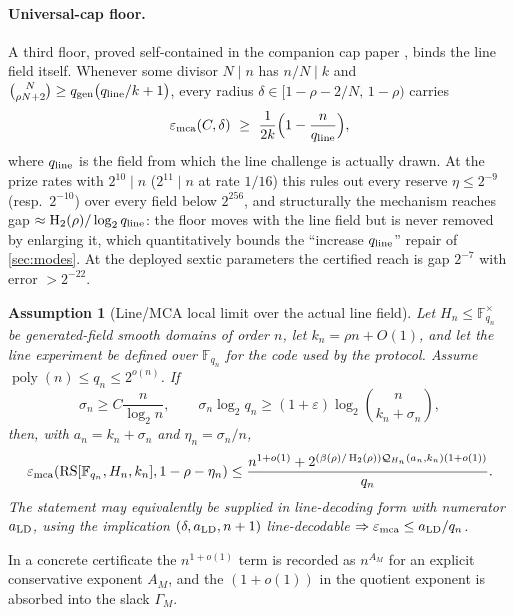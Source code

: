 \documentclass[11pt]{article}
\newtheorem{assumption}[theorem]{Assumption}
\theoremstyle{definition}
\newcommand{\F}{\mathbb F}
\newcommand{\RS}{\operatorname{RS}}
\newcommand{\poly}{\operatorname{poly}}
\newcommand{\eps}{\varepsilon}
\newcommand{\Hbin}{\operatorname{H}_2}
\newcommand{\mca}{\varepsilon_{\rm mca}}
\newcommand{\Qprof}{\mathcal Q}
\newcommand{\qgen}{q_{\rm gen}}
\newcommand{\qline}{q_{\rm line}}
\begin{document}
\paragraph{Universal-cap floor.}
A third floor, proved self-contained in the companion cap paper \cite{UniversalCap}, binds the line field itself.  Whenever some divisor $N\mid n$ has $n/N\mid k$ and $\binom{N}{\rho N+2}\ge\qgen\bigl(\qline/k+1\bigr)$, every radius $\delta\in[1-\rho-2/N,\,1-\rho)$ carries
\begin{equation}
\label{eq:cap-floor}
        \mca(C,\delta)\ \ge\ \frac1{2k}\Bigl(1-\frac n{\qline}\Bigr),
\end{equation}
where $\qline$ is the field from which the line challenge is actually drawn.  At the prize rates with $2^{10}\mid n$ ($2^{11}\mid n$ at rate $1/16$) this rules out every reserve $\eta\le2^{-9}$ (resp.\ $2^{-10}$) over every field below $2^{256}$, and structurally the mechanism reaches gap $\approx\Hbin(\rho)/\log_2\qline$: the floor moves with the line field but is never removed by enlarging it, which quantitatively bounds the ``increase $\qline$'' repair of \cref{sec:modes}.  At the deployed sextic parameters the certified reach is gap $2^{-7}$ with error $>2^{-22}$.

\begin{assumption}[Line/MCA local limit over the actual line field]
\label{ass:mca}
Let $H_n\le\F_{q_n}^{\times}$ be generated-field smooth domains of order $n$, let $k_n=\rho n+O(1)$, and let the line experiment be defined over $\F_{q_n}$ for the code used by the protocol.  Assume $\poly(n)\le q_n\le2^{o(n)}$.  If
\[
        \sigma_n\ge C\frac n{\log_2n},
        \qquad
        \sigma_n\log_2q_n\ge(1+\eps)\log_2\binom n{k_n+\sigma_n},
\]
then, with $a_n=k_n+\sigma_n$ and $\eta_n=\sigma_n/n$,
\begin{equation}
\label{eq:mca-assumption}
        \mca(\RS[\F_{q_n},H_n,k_n],1-\rho-\eta_n)
        \le
        \frac{n^{1+o(1)}
        +2^{(\beta(\rho)/\Hbin(\rho))\Qprof_{H_n}(a_n,k_n)(1+o(1))}}{q_n}.
\end{equation}
The statement may equivalently be supplied in line-decoding form with numerator $a_{\rm LD}$, using the implication $(\delta,a_{\rm LD},n+1)$ line-decodable $\Rightarrow\mca\le a_{\rm LD}/q_n$.
\end{assumption}

In a concrete certificate the $n^{1+o(1)}$ term is recorded as $n^{A_M}$ for an explicit conservative exponent $A_M$, and the $(1+o(1))$ in the quotient exponent is absorbed into the slack $\Gamma_M$.
\end{document}
